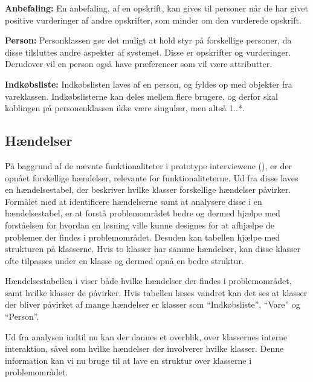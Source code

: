 \textbf{Anbefaling:}
En anbefaling, af en opskrift, kan gives til personer når de har givet positive vurderinger af andre opskrifter, som minder om den vurderede opskrift.

\textbf{Person:}
Personklassen gør det muligt at hold styr på forskellige personer, da disse tilsluttes andre aspekter af systemet.
Disse er opskrifter og vurderinger.
Derudover vil en person også have præferencer som vil være attributter.

\textbf{Indkøbsliste:}
Indkøbslisten laves af en person, og fyldes op med objekter fra vareklassen.
Indkøbslisterne kan deles mellem flere brugere, og derfor skal koblingen på personenklassen ikke være singulær, men altså 1..*. 

\subsection{Hændelser}\label{handelser}
På baggrund af de nævnte funktionaliteter i prototype interviewene (), er der opnået forskellige hændelser, relevante for funktionaliteterne.
Ud fra disse laves en hændelsestabel, der beskriver hvilke klasser forskellige hændelser påvirker.
Formålet med at identificere hændelserne samt at analysere disse i en hændelsestabel, er at forstå problemområdet bedre og dermed hjælpe med forståelsen for hvordan en løsning ville kunne designes for at afhjælpe de problemer der findes i problemområdet. Desuden kan tabellen hjælpe med strukturen på klasserne.
Hvis to klasser har samme hændelser, kan disse klasser ofte tilpasses under en klasse og dermed opnå en bedre struktur.



Hændelsestabellen i  viser både hvilke hændelser der findes i problemområdet, samt hvilke klasser de påvirker.
Hvis tabellen læses vandret kan det ses at klasser der bliver påvirket af mange hændelser er klasser som ``Indkøbsliste'', ``Vare'' og ``Person''.

Ud fra analysen indtil nu kan der dannes et overblik, over klassernes interne interaktion, såvel som hvilke hændelser der involverer hvilke klasser.
Denne information kan vi nu bruge til at lave en struktur over klasserne i problemområdet.
